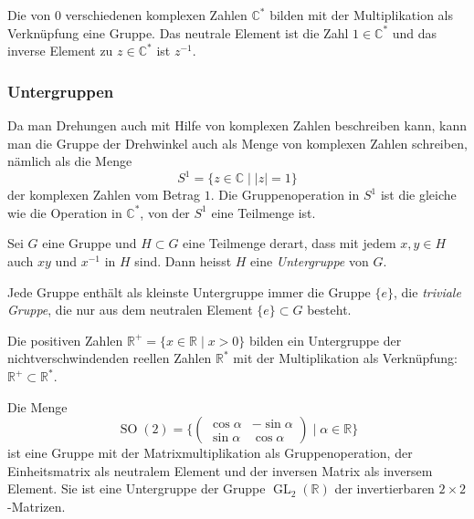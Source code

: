 \begin{beispiel}
Die von $0$ verschiedenen komplexen Zahlen $\mathbb{C}^*$ bilden mit
der Multiplikation als Verknüpfung eine Gruppe.
Das neutrale Element ist die Zahl $1\in\mathbb{C}^*$ und das inverse
Element zu $z\in\mathbb{C}^*$ ist $z^{-1}$.
\end{beispiel}

%
%
\subsubsection{Untergruppen}
Da man Drehungen auch mit Hilfe von komplexen Zahlen beschreiben kann,
kann man die Gruppe der Drehwinkel auch als Menge von komplexen Zahlen
schreiben, nämlich als die Menge
\[
S^1
=
\{z\in\mathbb{C}\mid |z|=1\}
\]
der komplexen Zahlen vom Betrag $1$.
Die Gruppenoperation in $S^1$ ist die gleiche wie die Operation
in $\mathbb{C}^*$, von der $S^1$ eine Teilmenge ist.

\begin{definition}
\label{buch:gruppen:definition:def:untergruppe}
Sei $G$ eine Gruppe und $H\subset G$ eine Teilmenge derart,
dass mit jedem $x,y\in H$ auch $xy$ und $x^{-1}$ in $H$ sind.
Dann heisst $H$ eine {\em Untergruppe} von $G$.
%
\end{definition}

Jede Gruppe enthält als kleinste Untergruppe immer die Gruppe $\{e\}$,
die {\em triviale Gruppe}, die nur aus dem neutralen Element
$\{e\}\subset G$ besteht.

\begin{beispiel}
Die positiven Zahlen $\mathbb{R}^+ = \{x\in \mathbb{R}\mid x>0\}$ 
bilden ein Untergruppe der nichtverschwindenden reellen Zahlen
$\mathbb{R}^*$ mit der Multiplikation als Verknüpfung:
$\mathbb{R}^+\subset\mathbb{R}^*$.
\end{beispiel}

\begin{beispiel}
\label{buch:gruppen:definition:bsp:so2}
Die Menge
\[
\operatorname{SO}(2)
=
\biggl\{
\begin{pmatrix}
\cos\alpha & -\sin\alpha \\
\sin\alpha &  \cos\alpha
\end{pmatrix}
\;
\bigg|
\;
\alpha\in\mathbb{R}
\biggr\}
\]
ist eine Gruppe mit der Matrixmultiplikation als Gruppenoperation,
der Einheitsmatrix als neutralem Element und der inversen Matrix
als inversem Element.
Sie ist eine Untergruppe der Gruppe $\operatorname{GL}_2(\mathbb{R})$
der invertierbaren $2\times 2$-Matrizen.
\end{beispiel}

